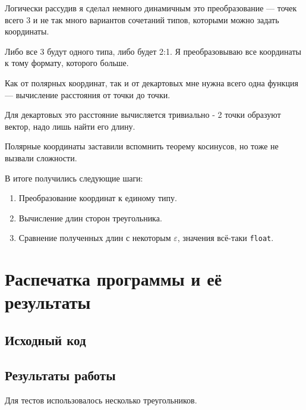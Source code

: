 \documentclass[12pt]{article}
\begin{document}
Логически рассудив я сделал немного динамичным это преобразование ---
точек всего 3 и не так много вариантов сочетаний типов, которыми можно задать координаты.

Либо все 3 будут одного типа, либо будет 2:1. Я преобразовываю все координаты к
тому формату, которого больше.

\smallbreak

Как от полярных координат, так и от декартовых мне нужна всего одна функция ---
вычисление расстояния от точки до точки.

Для декартовых это расстояние вычисляется тривиально - 2 точки образуют вектор,
надо лишь найти его длину.

Полярные координаты заставили вспомнить теорему косинусов,
но тоже не вызвали сложности.

В итоге получились следующие шаги:
\begin{enumerate}
  \item Преобразование координат к единому типу.
  \item Вычисление длин сторон треугольника.
  \item Сравнение полученных длин с некоторым $\varepsilon$, значения всё-таки {\tt float}.
\end{enumerate}

\section{Распечатка программы и её результаты}

\subsection{Исходный код}

\newpage

\subsection{Результаты работы}

Для тестов использовалось несколько треугольников.
\end{document}
